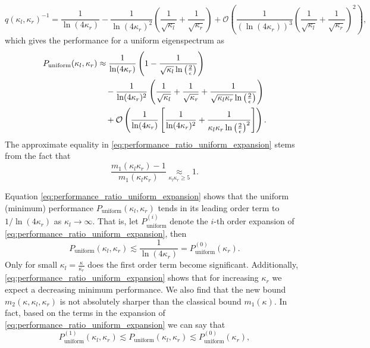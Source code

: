 \[
    q(\kappa_l, \kappa_r)^{-1} = \frac{1}{\ln(4\kappa_r)} - \frac{1}{\ln(4\kappa_r)^2}\left(\frac{1}{\sqrt{\kappa_l}} + \frac{1}{\sqrt{\kappa_r}}\right) + \mathcal{O}\left(\frac{1}{(\ln(4\kappa_r))^3}\left(\frac{1}{\sqrt{\kappa_l}} + \frac{1}{\sqrt{\kappa_r}}\right)^2\right),
\]
which gives the performance for a uniform eigenspectrum as
\begin{align}
    P_{\text{uniform}}(\kappa_l, \kappa_r) & \approx \frac{1}{\ln(4\kappa_r)} \left(1 - \frac{1}{\sqrt{\kappa_l}\ln\left(\frac{2}{\epsilon}\right)}\right) \notag                                                              \\
                                           & \quad - \frac{1}{\ln(4\kappa_r)^2}\left(\frac{1}{\sqrt{\kappa_l}} + \frac{1}{\sqrt{\kappa_r}} + \frac{1}{\sqrt{\kappa_l\kappa_r}\ln\left(\frac{2}{\epsilon}\right)}\right) \notag \\
                                           & \quad + \mathcal{O}\left(\frac{1}{\ln(4\kappa_r)}\left[\frac{1}{\ln(4\kappa_r)^2} + \frac{1}{\kappa_l\kappa_r\ln\left(\frac{2}{\epsilon}\right)^2}\right]\right).
    \label{eq:performance_ratio_uniform_expansion}
\end{align}
The approximate equality in \cref{eq:performance_ratio_uniform_expansion} stems from the fact that
\[
    \frac{m_1(\kappa_l\kappa_r)-1}{m_1(\kappa_l\kappa_r)} \underset{\kappa_l\kappa_r \geq 5}{\approx} 1.
\]

Equation \ref{eq:performance_ratio_uniform_expansion} shows that the uniform (minimum) performance $P_{\text{uniform}}(\kappa_l, \kappa_r)$ tends in its leading order term to $1/\ln(4\kappa_r)$ as $\kappa_l \to \infty$. That is, let $P^{(i)}_{\text{uniform}}$ denote the $i$-th order expansion of \cref{eq:performance_ratio_uniform_expansion}, then
\[
    P_{\text{uniform}}(\kappa_l, \kappa_r) \lesssim \frac{1}{\ln(4\kappa_r)} = P^{(0)}_{\text{uniform}}(\kappa_r).
\]
Only for small $\kappa_l = \frac{\kappa}{\kappa_r}$ does the first order term become significant. Additionally, \cref{eq:performance_ratio_uniform_expansion} shows that for increasing $\kappa_r$ we expect a decreasing minimum performance. We also find that the new bound $m_2(\kappa,\kappa_l,\kappa_r)$ is not absolutely sharper than the classical bound $m_1(\kappa)$. In fact, based on the terms in the expansion of \cref{eq:performance_ratio_uniform_expansion} we can say that
\begin{equation}
    P^{(1)}_{\text{uniform}}(\kappa_l, \kappa_r) \lesssim P_{\text{uniform}}(\kappa_l, \kappa_r) \lesssim P^{(0)}_{\text{uniform}}(\kappa_r),
    \label{eq:performance_ratio_no_improvement_bounds}
\end{equation}

